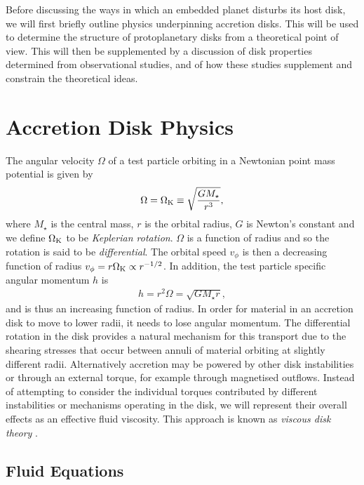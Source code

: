 \setlength{\headheight}{13.59999pt}

Before discussing the ways in which an embedded planet disturbs its host disk, we will first briefly outline physics underpinning accretion disks.
This will be used to determine the structure of protoplanetary disks from a theoretical point of view.
This will then be supplemented by a discussion of disk properties determined from observational studies, and of how these studies supplement and constrain the theoretical ideas.

\section{Accretion Disk Physics}

The angular velocity $\Omega$ of a test particle orbiting in a Newtonian point mass potential is given by
\begin{align}
    \Omega = \Omega_{\rm K} \equiv \sqrt{\frac{G M_\star}{r^3}}, \label{eq:point_pot}
\end{align}
where $M_\star$ is the central mass, $r$ is the orbital radius, $G$ is Newton's constant and we  define $\Omega_{\rm K}$ to be \textit{Keplerian rotation}.
$\Omega$ is a function of radius and so the rotation is said to be \textit{differential}.
The orbital speed $v_\phi$ is then a decreasing function of radius $v_\phi = r \Omega_{\rm K} \propto r^{-1/2}$.
In addition, the test particle specific angular momentum $h$ is
\begin{align}
    h = r^2 \Omega = \sqrt{G M_\star r}, \label{eq:ang_mom}
\end{align}
and is thus an increasing function of radius.
In order for material in an accretion disk to move to lower radii, it needs to lose angular momentum.
The differential rotation in the disk provides a natural mechanism for this transport due to the shearing stresses that occur between annuli of material orbiting at slightly different radii.
Alternatively accretion may be powered by other disk instabilities or through an external torque, for example through magnetised outflows.
Instead of attempting to consider the individual torques contributed by different instabilities or mechanisms operating in the disk, we will represent their overall effects as an effective fluid viscosity.
This approach is known as \textit{viscous disk theory} \citep{lynden-bell1974,shakura1973}.

\subsection{Fluid Equations} \label{sec:fluid_eqns}

